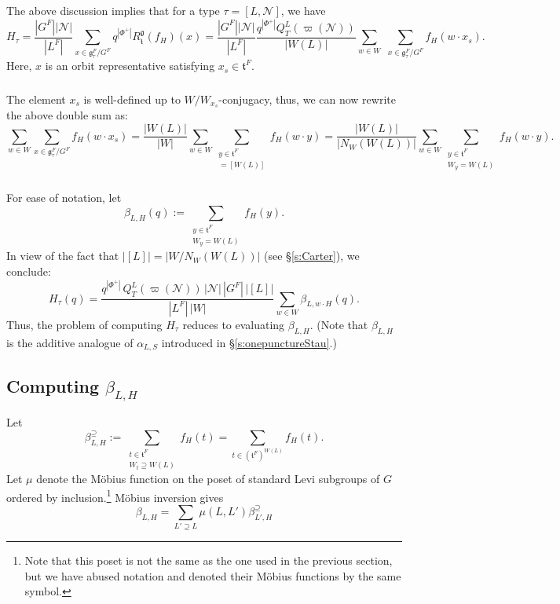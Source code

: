\documentclass[12pt]{amsart}
\theoremstyle{plain}
\theoremstyle{definition}
\theoremstyle{remark}
\newcommand{\cN}{\mathcal{N}}
\newcommand{\fg}{\mathfrak{g}}
\newcommand{\ft}{\mathfrak{t}}
\begin{document}
\subsubsection{} The above discussion implies that for a type $\tau=[L,\cN]$, we have  
\[
H_\tau=\frac{|G^F||\cN|}{|L^F|} \sum_{x \in \fg^F_\tau/G^F}  {q^{|\Phi^+|} } R_{\ft}^{\fg}(f_H)(x) = 
\frac{|G^F||\cN|}{|L^F|} \frac{ q^{|\Phi^+|}Q_{T}^{L}(\varpi(\cN))}{ |W(L)|} \sum_{w\in W} \, \, \sum_{x\in \fg^F_\tau/G^F} f_H(w\cdot x_s). 
\]
Here, $x$ is an orbit representative satisfying $x_s\in \ft^F$. 

\subsubsection{} The element $x_s$ is well-defined up to $W/W_{x_s}$-conjugacy, thus, we can now rewrite the above double sum as: 
\[
\sum_{w\in W} \sum_{x\in \fg^F_\tau/G^F}  f_H(w\cdot x_s) =\frac{|W(L)|}{|W|}
\sum_{w\in W} \sum_{{\substack{y\in \ft^F \\ [W_{y}]= [W(L)]}}}   f_H(w\cdot y) = 
 \frac{|W(L)|}{|N_W(W(L))|} \sum_{w\in W} \sum_{{\substack{y\in \ft^F \\ W_y=W(L)}}} f_H(w\cdot y).
\]



\subsubsection{} For ease of notation, let 
\[
\beta_{L,H}(q):= \sum_{\substack{y\in \ft^F\\ W_y=W(L)}} f_H(y). 
\]
In view of the fact that $|[L]|=|W/N_W(W(L))|$ (see \S \ref{s:Carter}), we conclude:  
\[
\boxed{H_\tau(q)= \frac{q^{|\Phi^+|}\, Q_{T}^{L}(\varpi(\cN))\, |\cN|\, |G^F|\, |[L]|}{|L^F|\, |W| } \sum_{w\in W} \beta_{L,w\cdot H}(q).}
\]
Thus, the problem of computing $H_\tau$ reduces to evaluating $\beta_{L,H}$. (Note that $\beta_{L,H}$ is the additive analogue of $\alpha_{L, S}$ introduced in \S\ref{s:onepunctureStau}.)


\subsection{Computing $\beta_{L,H}$} Let 
\[
\beta_{L,H}^\supseteq:=  \sum_{\substack{t\in \ft^F \\ W_t\supseteq W(L)}} f_H(t) = \sum_{t\in (\ft^F)^{W(L)}} f_H(t).  
\]
Let $\mu$ denote the M\"{o}bius function on the poset of standard Levi subgroups of $G$ ordered by inclusion.\footnote{Note that this poset is not the same as the one used in the previous section, but we have abused notation and denoted their M\"obius functions by the same symbol.} M\"{o}bius inversion gives
\[
\beta_{L,H}= \sum_{L'\supseteq L} \mu(L,L') \beta_{L',H}^\supseteq
\]
\end{document}
